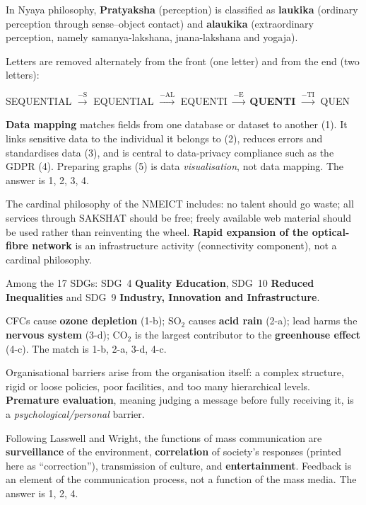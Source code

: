 In Nyaya philosophy, \textbf{Pratyaksha} (perception) is classified as \textbf{laukika} (ordinary perception through sense--object contact) and \textbf{alaukika} (extraordinary perception, namely samanya-lakshana, jnana-lakshana and yogaja).

Letters are removed alternately from the front (one letter) and from the end (two letters):
\begin{center}
SEQUENTIAL $\xrightarrow{-\text{S}}$ EQUENTIAL $\xrightarrow{-\text{AL}}$ EQUENTI $\xrightarrow{-\text{E}}$ \textbf{QUENTI} $\xrightarrow{-\text{TI}}$ QUEN
\end{center}

\textbf{Data mapping} matches fields from one database or dataset to another (1). It links sensitive data to the individual it belongs to (2), reduces errors and standardises data (3), and is central to data-privacy compliance such as the GDPR (4). Preparing graphs (5) is data \emph{visualisation}, not data mapping. The answer is 1, 2, 3, 4.

The cardinal philosophy of the NMEICT includes: no talent should go waste; all services through SAKSHAT should be free; freely available web material should be used rather than reinventing the wheel. \textbf{Rapid expansion of the optical-fibre network} is an infrastructure activity (connectivity component), not a cardinal philosophy.

Among the 17 SDGs: SDG~4 \textbf{Quality Education}, SDG~10 \textbf{Reduced Inequalities} and SDG~9 \textbf{Industry, Innovation and Infrastructure}.

CFCs cause \textbf{ozone depletion} (1-b); SO$_2$ causes \textbf{acid rain} (2-a); lead harms the \textbf{nervous system} (3-d); CO$_2$ is the largest contributor to the \textbf{greenhouse effect} (4-c). The match is 1-b, 2-a, 3-d, 4-c.

Organisational barriers arise from the organisation itself: a complex structure, rigid or loose policies, poor facilities, and too many hierarchical levels. \textbf{Premature evaluation}, meaning judging a message before fully receiving it, is a \emph{psychological/personal} barrier.

Following Lasswell and Wright, the functions of mass communication are \textbf{surveillance} of the environment, \textbf{correlation} of society's responses (printed here as ``correction''), transmission of culture, and \textbf{entertainment}. Feedback is an element of the communication process, not a function of the mass media. The answer is 1, 2, 4.

